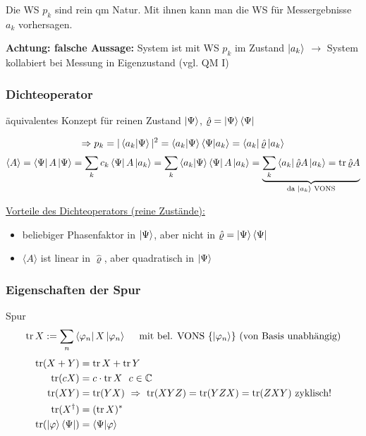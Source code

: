 Die WS $p_k$ sind rein qm Natur. Mit ihnen kann man die WS für Messergebnisse $a_k$ vorhersagen.

\textbf{Achtung: falsche Aussage:} \glqq System ist mit WS $p_k$ im Zustand $\ket{a_k}$ \grqq $\rightarrow$ System kollabiert bei Messung in Eigenzustand (vgl. QM I)

\subsubsection*{Dichteoperator}
äquivalentes Konzept für reinen Zustand $\ket{\Psi}$, $\hat{\varrho} = \ket{\Psi} \bra{\Psi}$

\begin{equation}
    \Rightarrow p_k = |\braket{a_k}{\Psi}|^2 = \braket{a_k}{\Psi}\braket{\Psi}{a_k} = \bra{a_k} \hat{\varrho} \ket{a_k}
\end{equation}
\begin{align}
    \langle A \rangle = \bra{\Psi} A \ket{\Psi} = \sum_k c_k \bra{\Psi} A \ket{a_k} = \sum_k \braket{a_k}{\Psi} \bra{\Psi} A \ket{a_k} = \underbrace{\sum_k \bra{a_k} \hat{\varrho} A \ket{a_k}
    = \trace \hat{\varrho} A}_{\text{da $\ket{a_k}$ VONS}}
\end{align}

\underline{Vorteile des Dichteoperators (reine Zustände):}
\begin{itemize}
    \item beliebiger Phasenfaktor in $\ket{\Psi}$, aber nicht in $\hat{\varrho} = \ket{\Psi} \bra{\Psi}$
    \item $\langle A \rangle$ ist linear in $\hat{\varrho}$, aber quadratisch in $\ket{\Psi}$
\end{itemize}

\subsubsection*{Eigenschaften der Spur}
\begin{definition}{Spur}
    \begin{equation}
        \trace X := \sum_n \bra{\varphi_n}X\ket{\varphi_n} \ \ \ \text{ mit bel. VONS } \{\ket{\varphi_n}\} \text{ (von Basis unabhängig)}
    \end{equation}
    \begin{align}
        \trace (X+Y) &= \trace X + \trace Y  \\ 
        \trace(cX) &= c \cdot \trace X  \ \ c \in \mathbb{C} \\
        \trace (XY) &= \trace(YX) \   \Rightarrow \ \trace(XYZ) = \trace(YZX) = \trace (ZXY) \text{ zyklisch!} \\
        \trace (X^{\dag}) &= (\trace X)^* \\
        \trace(\ket{\varphi}\bra{\Psi}) &= \braket{\Psi}{\varphi}
    \end{align}
\end{definition}

